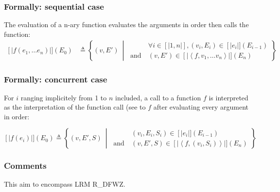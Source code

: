 \documentclass{book}
\newcommand\llbracket{[|}
\newcommand\rrbracket{|]}
\newcommand\interp[1]{\left\llbracket #1 \right\rrbracket}
\newcommand\st[0]{\ \middle|\ }
\begin{document}
  \subsubsection{Formally: sequential case}
  The evaluation of a n-ary function evaluates the arguments in order then
  calls the function:
  \begin{align}
  \interp{f (e_1, \dotsc e_n)} (E_0) & \triangleq
    \left\{ (v, E') \st{}
    \begin{aligned}
      & \forall i \in \llbracket 1, n \rrbracket, (v_i, E_i) \in \interp{e_i} (E_{i - 1})
      \\ \text{and}\ &
      (v, E') \in \interp{\left\langle f, v_1, \dotsc v_n \right\rangle} \left(E_n\right)
    \end{aligned}
    \right\}
  \label{eq:sem-det-fcall}
  \end{align} 

  \subsubsection{Formally: concurrent case}
  For $i$ ranging implicitely from 1 to $n$ included, a call to a function $f$
  is interpreted as the interpretation of the function call (see to $f$ after
  evaluating every argument in order:

  \begin{equation}
    \interp{f (e_i)} (E_0) \triangleq
      \left\{ (v, E', S) \st{}
      \begin{aligned}
        & %
          (v_i, E_i, S_i) \in \interp{e_i} (E_{i - 1})
        \\ \text{and}\ &
        (v, E', S) \in \interp{\left\langle f, (v_i,S_i) \right\rangle} \left(E_n\right)
      \end{aligned}
      \right\}
    \label{eq:sem-ndet-fcall}
  \end{equation}

  \subsubsection{Comments}
  This aim to encompass LRM R\_DFWZ.
\end{document}
